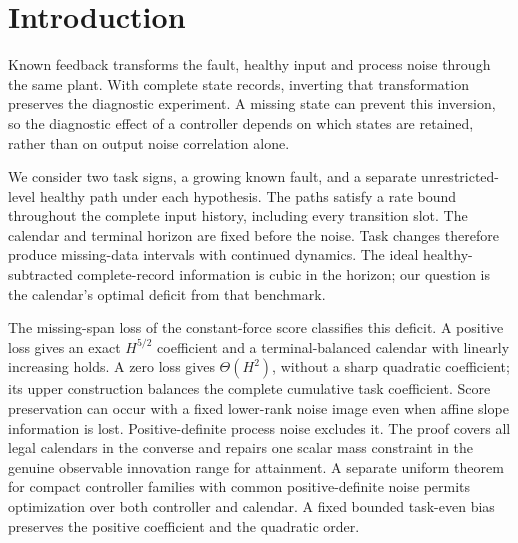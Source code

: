 \begin{abstract}
We study deterministic diagnostic calendars for a known stable linear plant
with complete retained states and a scalar healthy input that drifts throughout
holds and missing intervals. When the fixed Gaussian process-noise image
contains the fault direction, the constant-force score loss across a missing
span determines two regimes: a sharp deficit of order $H^{5/2}$ when that loss
is positive, and an order-sharp $\Theta(H^2)$ deficit when the score is preserved.
Both results compare with an ideal healthy-subtracted complete record and use
the complete input clock, calendar-uniform lower bounds, and observable
attaining constructions. Positive-definite noise forces the first regime;
a separate compact common-noise controller theorem permits joint leading-order
design. Controller examples and an independent nonlinear mechanical certificate
explain the information restrictions and finite-risk obligations of these laws.
\end{abstract}

\section{Introduction}\label{sf:introduction}
Known feedback transforms the fault, healthy input and process noise through
the same plant. With complete state records, inverting that transformation
preserves the diagnostic experiment. A missing state can prevent this inversion,
so the diagnostic effect of a controller depends on which states are retained,
rather than on output noise correlation alone.

We consider two task signs, a growing known fault, and a separate unrestricted-level
healthy path under each hypothesis. The paths satisfy a rate bound throughout
the complete input history, including every transition slot. The calendar and
terminal horizon are fixed before the noise. Task changes therefore produce
missing-data intervals with continued dynamics. The ideal healthy-subtracted
complete-record information is cubic in the horizon; our question is the
calendar's optimal deficit from that benchmark.

The missing-span loss of the constant-force score classifies this deficit.
A positive loss gives an exact $H^{5/2}$ coefficient and a terminal-balanced
calendar with linearly increasing holds. A zero loss gives $\Theta(H^2)$,
without a sharp quadratic coefficient; its upper construction balances the
complete cumulative task coefficient. Score preservation can occur with a
fixed lower-rank noise image even when affine slope information is lost.
Positive-definite process noise excludes it. The proof covers all legal calendars
in the converse and repairs one scalar mass constraint in the genuine observable
innovation range for attainment. A separate uniform theorem for compact
controller families with common positive-definite noise permits optimization
over both controller and calendar. A fixed bounded task-even bias preserves
the positive coefficient and the quadratic order.

